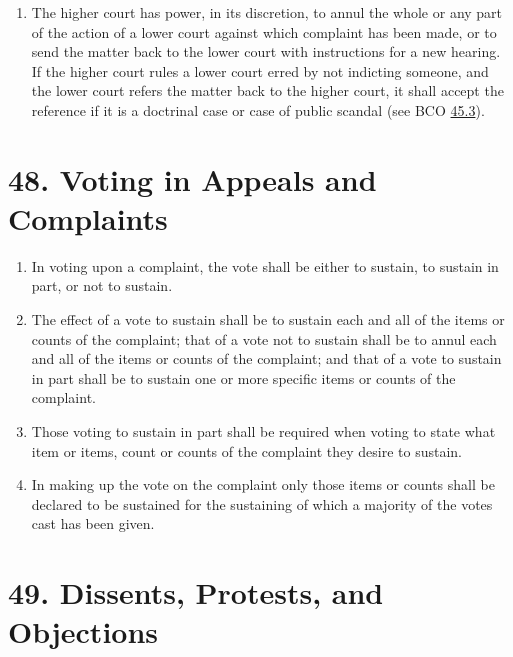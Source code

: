 \documentclass[
]{book}
\providecommand{\tightlist}{%
  \setlength{\itemsep}{0pt}\setlength{\parskip}{0pt}}
\begin{document}
\begin{enumerate}
\item
  The higher court has power, in its discretion, to annul the whole or any part of the action of a lower court against which complaint has been made, or to send the matter back to the lower court with instructions for a new hearing. If the higher court rules a lower court erred by not indicting someone, and the lower court refers the matter back to the higher court, it shall accept the reference if it is a doctrinal case or case of public scandal (see BCO \protect\hyperlink{45.3}{45.3}).
\end{enumerate}

\hypertarget{voting-in-appeals-and-complaints}{%
\section*{48. Voting in Appeals and Complaints}\label{voting-in-appeals-and-complaints}}

\protect\hypertarget{chapter-slug-48-voting-in-appeals-and-complaints}{\href{}{}}

\begin{enumerate}
\def\labelenumi{\arabic{enumi}.}
\tightlist
\item
  \protect\hypertarget{48}{\href{}{}}In voting upon a complaint, the vote shall be either to sustain, to sustain in part, or not to sustain.
\item
  The effect of a vote to sustain shall be to sustain each and all of the items or counts of the complaint; that of a vote not to sustain shall be to annul each and all of the items or counts of the complaint; and that of a vote to sustain in part shall be to sustain one or more specific items or counts of the complaint.
\item
  Those voting to sustain in part shall be required when voting to state what item or items, count or counts of the complaint they desire to sustain.
\item
  In making up the vote on the complaint only those items or counts shall be declared to be sustained for the sustaining of which a majority of the votes cast has been given.
\end{enumerate}

\hypertarget{dissents-protests-and-objections}{%
\section*{49. Dissents, Protests, and Objections}\label{dissents-protests-and-objections}}
\end{document}
